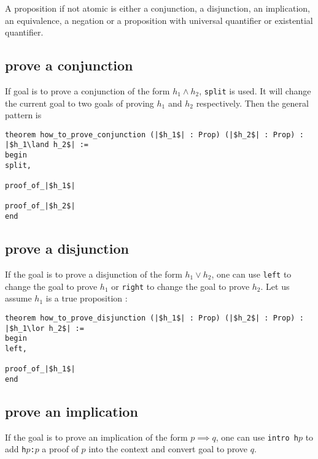 \documentclass{report}
\theoremstyle{definition}
\theoremstyle{plain}
\begin{document}



A proposition if not atomic is either a conjunction, a disjunction, an implication, an equivalence, a negation or a proposition with universal quantifier or existential quantifier.

\subsection{prove a conjunction}\label{lean:conj}
If goal is to prove a conjunction of the form $h_1 \land h_2$, {\tt split} is used. It will change the current goal to two goals of proving $h_1$ and $h_2$ respectively. Then the general pattern is

\begin{verbatim}
theorem how_to_prove_conjunction (|$h_1$| : Prop) (|$h_2$| : Prop) : |$h_1\land h_2$| :=
begin
split,

proof_of_|$h_1$|

proof_of_|$h_2$|
end
\end{verbatim}


\subsection{prove a disjunction}\label{lean:disjun}
If the goal is to prove a disjunction of the form $h_1 \lor h_2$, one can use {\tt left} to change the goal to prove $h_1$ or {\tt right} to change the goal to prove $h_2$. Let us assume $h_1$ is a true proposition :

\begin{verbatim}
theorem how_to_prove_disjunction (|$h_1$| : Prop) (|$h_2$| : Prop) : |$h_1\lor h_2$| :=
begin
left,
  
proof_of_|$h_1$|
end
\end{verbatim}


\subsection{prove an implication}\label{lean:imp}
If the goal is to prove an implication of the form $p \implies q$, one can use {\tt intro h$p$} to add {\tt h$p$:$p$} a proof of $p$ into the context and convert goal to prove $q$.
\end{document}
